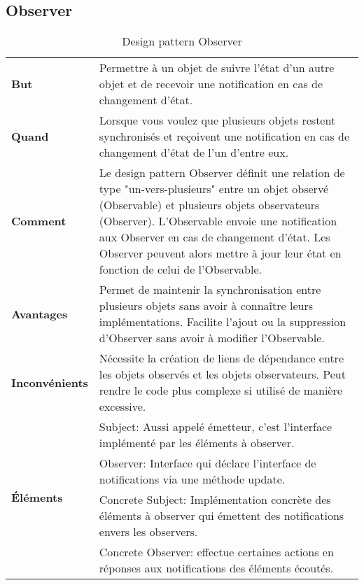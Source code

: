 \subsection{Observer}\label{subsec:observer}

\begin{table}[H]
\caption{Design pattern Observer}
\label{tbl:design_patterns_observer}
\begin{adjustbox}{max width=\textwidth}
\begin{tabular}{l|p{\textwidth}}
\toprule
\textbf{But} & Permettre à un objet de suivre l'état d'un autre objet et de recevoir une notification en cas de changement d'état.\\
\cmidrule(lr){1-2}
\textbf{Quand} & Lorsque vous voulez que plusieurs objets restent synchronisés et reçoivent une notification en cas de changement d'état de l'un d'entre eux.\\
\cmidrule(lr){1-2}
\textbf{Comment} & Le design pattern Observer définit une relation de type "un-vers-plusieurs" entre un objet observé (Observable) et plusieurs objets observateurs (Observer). L'Observable envoie une notification aux Observer en cas de changement d'état. Les Observer peuvent alors mettre à jour leur état en fonction de celui de l'Observable.\\
\cmidrule(lr){1-2}
\textbf{Avantages} & Permet de maintenir la synchronisation entre plusieurs objets sans avoir à connaître leurs implémentations. Facilite l'ajout ou la suppression d'Observer sans avoir à modifier l'Observable.\\
\cmidrule(lr){1-2}
\textbf{Inconvénients} & Nécessite la création de liens de dépendance entre les objets observés et les objets observateurs. Peut rendre le code plus complexe si utilisé de manière excessive.\\
\cmidrule(lr){1-2}
\multirow{4}{*}{\textbf{\'El\'ements}} & Subject: Aussi appel\'e \'emetteur, c'est l'interface impl\'ement\'e par les \'el\'ements \`a observer.\\
& Observer: Interface qui d\'eclare l'interface de notifications via une m\'ethode update.\\
& Concrete Subject: Impl\'ementation concr\`ete des \'el\'ements \`a observer qui \'emettent des notifications envers les observers. \\
& Concrete Observer: effectue certaines actions en r\'eponses aux notifications des \'el\'ements \'ecout\'es.\\

\end{tabular}
\end{adjustbox}
\end{table}
